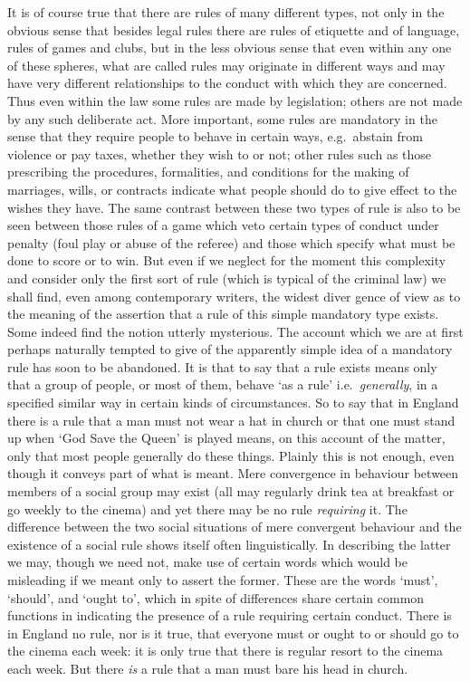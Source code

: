 \documentclass[12pt,oneside]{book}  %
\begin{document}
It is of course true that there are rules of many different types, not
only in the obvious sense that besides legal rules there are rules of
etiquette and of language, rules of games and clubs, but in the less
obvious sense that even within any one of these spheres, what are called
rules may originate in different ways and may have very different
relationships to the conduct with which they are concerned. Thus even
within the law some rules are made by legislation; others are not made
by any such deliberate act. More important, some rules are mandatory in
the sense that they require people to behave in certain ways,
e.g.~abstain from violence or pay taxes, whether they wish to or not;
other rules such as those prescribing the procedures, formalities, and
conditions for the making of marriages, wills, or contracts indicate
what people should do to give effect to the wishes they have. The same
contrast between these two types of rule is also to be seen between
those rules of a game which veto certain types of conduct under penalty
(foul play or abuse of the referee) and those which specify what must be
done to score or to win. But even if we neglect for the moment this
complexity and consider only the first sort of rule (which is typical of
the criminal law) we shall find, even among contemporary writers, the
widest diver gence of view as to the meaning of the assertion that a
rule of this simple mandatory type exists. Some indeed find the notion
utterly mysterious. The account which we are at first perhaps naturally
tempted to give of the apparently simple idea of a mandatory rule has
soon to be abandoned. It is that to say that a rule exists means only
that a group of people, or most of them, behave `as a rule'
i.e.~\emph{generally}, in a specified similar way in certain kinds of
circumstances. So to say that in England there is a rule that a man must
not wear a hat in church or that one must stand up when `God Save the
Queen' is played means, on this account of the matter, only that most
people generally do these things. Plainly this is not enough, even
though it conveys part of what is meant. Mere convergence in behaviour
between members of a social group may exist (all may regularly drink tea
at breakfast or go weekly to the cinema) and yet there may be no rule
\emph{requiring} it. The difference between the two social situations of
mere convergent behaviour and the existence of a social rule shows
itself often linguistically. In describing the latter we may, though we
need not, make use of certain words which would be misleading if we
meant only to assert the former. These are the words `must', `should',
and `ought to', which in spite of differences share certain common
functions in indicating the presence of a rule requiring certain
conduct. There is in England no rule, nor is it true, that everyone must
or ought to or should go to the cinema each week: it is only true that
there is regular resort to the cinema each week. But there \emph{is} a
rule that a man must bare his head in church.
\end{document}
